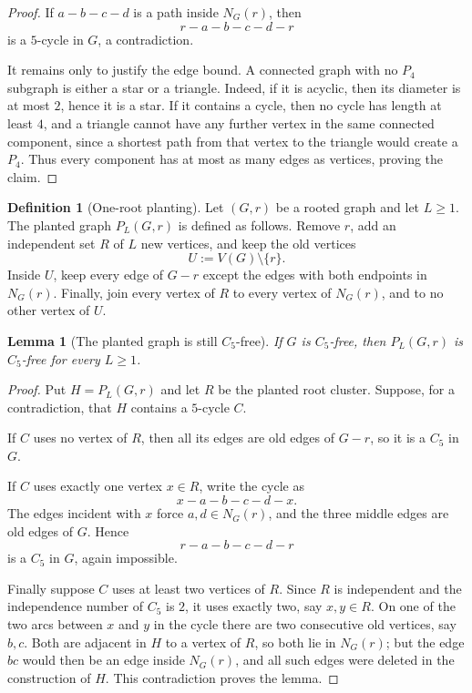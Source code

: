 \documentclass[11pt]{article}
\newtheorem{lemma}[theorem]{Lemma}
\theoremstyle{definition}
\newtheorem{definition}[theorem]{Definition}
\begin{document}
\begin{proof}
If $a-b-c-d$ is a path inside $N_G(r)$, then
\[
  r-a-b-c-d-r
\]
is a $5$-cycle in $G$, a contradiction.

It remains only to justify the edge bound.  A connected graph with no $P_4$
subgraph is either a star or a triangle.  Indeed, if it is acyclic, then its
diameter is at most $2$, hence it is a star.  If it contains a cycle, then no
cycle has length at least $4$, and a triangle cannot have any further vertex in
the same connected component, since a shortest path from that vertex to the
triangle would create a $P_4$.  Thus every component has at most as many edges
as vertices, proving the claim.
\end{proof}

\begin{definition}[One-root planting]\label{def:planting}
Let $(G,r)$ be a rooted graph and let $L\ge 1$.  The planted graph
$P_L(G,r)$ is defined as follows.  Remove $r$, add an independent set $R$ of
$L$ new vertices, and keep the old vertices
\[
  U:=V(G)\setminus\{r\}.
\]
Inside $U$, keep every edge of $G-r$ except the edges with both endpoints in
$N_G(r)$.  Finally, join every vertex of $R$ to every vertex of $N_G(r)$, and
to no other vertex of $U$.
\end{definition}

\begin{lemma}[The planted graph is still $C_5$-free]\label{lem:planting-c5-free}
If $G$ is $C_5$-free, then $P_L(G,r)$ is $C_5$-free for every $L\ge1$.
\end{lemma}

\begin{proof}
Put $H=P_L(G,r)$ and let $R$ be the planted root cluster.  Suppose, for a
contradiction, that $H$ contains a $5$-cycle $C$.

If $C$ uses no vertex of $R$, then all its edges are old edges of $G-r$, so it
is a $C_5$ in $G$.

If $C$ uses exactly one vertex $x\in R$, write the cycle as
\[
  x-a-b-c-d-x.
\]
The edges incident with $x$ force $a,d\in N_G(r)$, and the three middle edges
are old edges of $G$.  Hence
\[
  r-a-b-c-d-r
\]
is a $C_5$ in $G$, again impossible.

Finally suppose $C$ uses at least two vertices of $R$.  Since $R$ is
independent and the independence number of $C_5$ is $2$, it uses exactly two,
say $x,y\in R$.  On one of the two arcs between $x$ and $y$ in the cycle there
are two consecutive old vertices, say $b,c$.  Both are adjacent in $H$ to a
vertex of $R$, so both lie in $N_G(r)$; but the edge $bc$ would then be an edge
inside $N_G(r)$, and all such edges were deleted in the construction of $H$.
This contradiction proves the lemma.
\end{proof}
\end{document}
